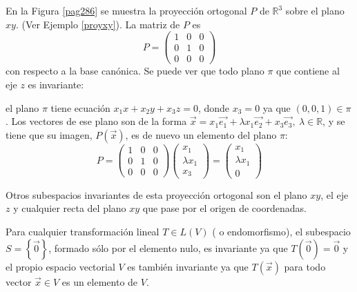 \begin{example}

En la Figura \ref{pag286} se muestra   la proyección ortogonal $P$ de $\mathbb{R}^3$  sobre el plano $xy$. (Ver Ejemplo \ref{proyxy}). La matriz de $P$ es 
$$P=\left(\begin{array}{ccc} 1 & 0 &  0 \\ 0 & 1 & 0
\\ 0 & 0 & 0
\end{array}
 \right)$$
con respecto a la base canónica. Se puede ver que todo plano $\pi$  que contiene al eje $z$ es invariante:

\noindent
el plano  $\pi$ tiene ecuación $x_1 x +  x_2 y + x_3 z=0$, donde $x_3=0$ ya que $(0,0,1) \in \pi$. Los vectores de ese plano  son de la forma
$\vec{x}=x_1\vec{e_1} + \lambda x_1\vec{e_2} + x_3\vec{e_3}, ~\lambda \in \mathbb{R}$,
y se  tiene que su imagen, $P(\vec{x})$,  es de nuevo un elemento del plano $\pi$:
$$P=\left(\begin{array}{ccc} 1 & 0 &  0 \\ 0 & 1 & 0
\\ 0 & 0 & 0
\end{array}
 \right)      \left(\begin{array}{c} x_1 \\ \lambda x_1
\\ x_3
\end{array}
 \right) =   \left(\begin{array}{c} x_1 \\ \lambda x_1
\\ 0
\end{array}
 \right)            $$



\bigskip




Otros subespacios invariantes de esta proyección ortogonal son el plano $xy$, el eje $z$ y cualquier recta del plano $xy$ que pase por el origen de coordenadas.
\end{example}

\bigskip

\begin{remark}
Para cualquier transformación lineal  $T\in L(V)$ ( o endomorfismo), el subespacio $S=\left\{\vec{0}\right\}$, formado sólo por el elemento nulo, es invariante ya que $T(\vec{0})=\vec{0}$ y el propio espacio vectorial $V$ es también invariante ya que $T(\vec{x})$ para todo vector  $\vec{x}\in V$ es un elemento de $V$.
\end{remark}

